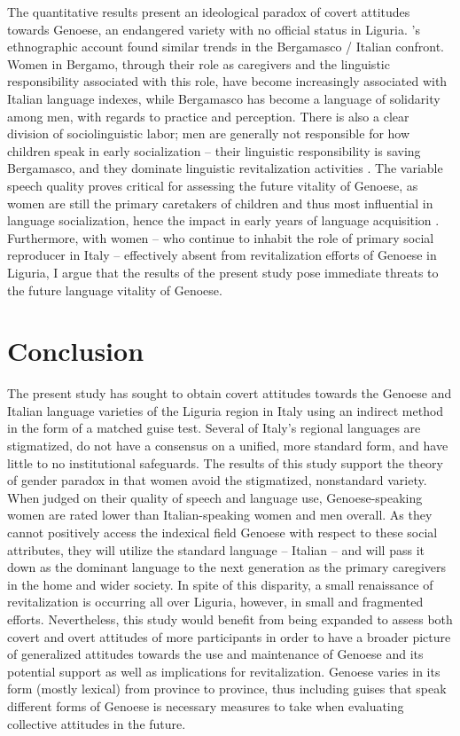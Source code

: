 \documentclass[output=paper,colorlinks,citecolor=brown]{langscibook}
\begin{document}
\par The quantitative results present an ideological paradox of covert attitudes towards Genoese, an endangered variety with no official status in Liguria. \citeauthor{cava06}’s ethnographic account \citeyear{cava06} found similar trends in the Bergamasco / Italian confront. Women in Bergamo, through their role as caregivers and the linguistic responsibility associated with this role, have become increasingly associated with Italian language indexes, while Bergamasco has become a language of solidarity among men, with regards to practice and perception. There is also a clear division of sociolinguistic labor; men are generally not responsible for how children speak in early socialization – their linguistic responsibility is saving Bergamasco, and they dominate linguistic revitalization activities \citep{cava06}. The variable speech quality proves critical for assessing the future vitality of Genoese, as women are still the primary caretakers of children and thus most influential in language socialization, hence the impact in early years of language acquisition \citep{poto08}. Furthermore, with women – who continue to inhabit the role of primary social reproducer in Italy – effectively absent from revitalization efforts of Genoese in Liguria, I argue that the results of the present study pose immediate threats to the future language vitality of Genoese.

\section{Conclusion}
The present study has sought to obtain covert attitudes towards the Genoese and Italian language varieties of the Liguria region in Italy using an indirect method in the form of a matched guise test. Several of Italy’s regional languages are stigmatized, do not have a consensus on a unified, more standard form, and have little to no institutional safeguards. The results of this study support the theory of gender paradox in that women avoid the stigmatized, nonstandard variety. When judged on their quality of speech and language use, Genoese-speaking women are rated lower than Italian-speaking women and men overall. As they cannot positively access the indexical field Genoese with respect to these social attributes, they will utilize the standard language – Italian – and will pass it down as the dominant language to the next generation as the primary caregivers in the home and wider society. In spite of this disparity, a small renaissance of revitalization is occurring all over Liguria, however, in small and fragmented efforts. Nevertheless, this study would benefit from being expanded to assess both covert and overt attitudes of more participants in order to have a broader picture of generalized attitudes towards the use and maintenance of Genoese and its potential support as well as implications for revitalization. Genoese varies in its form (mostly lexical) from province to province, thus including guises that speak different forms of Genoese is necessary measures to take when evaluating collective attitudes in the future.
\end{document}
